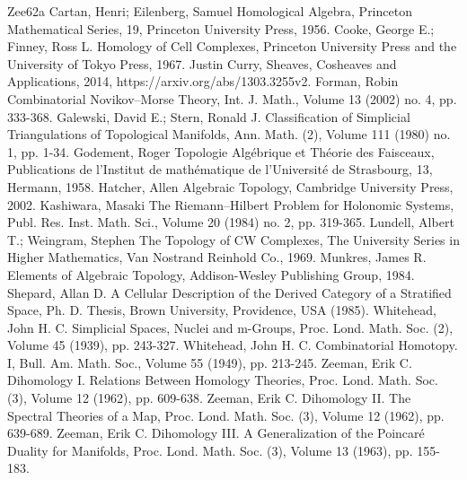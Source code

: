 
\begin{thebibliography}{Zee62a}
 Cartan, Henri; Eilenberg, Samuel Homological Algebra, Princeton Mathematical Series, 19, Princeton University Press, 1956.
 Cooke, George E.; Finney, Ross L. Homology of Cell Complexes, Princeton University Press and the University of Tokyo Press, 1967.
 Justin Curry, Sheaves, Cosheaves and Applications, 2014, https://arxiv.org/abs/1303.3255v2.
 Forman, Robin Combinatorial Novikov–Morse Theory, Int. J. Math., Volume 13 (2002) no. 4, pp. 333-368.
 Galewski, David E.; Stern, Ronald J. Classification of Simplicial Triangulations of Topological Manifolds, Ann. Math. (2), Volume 111 (1980) no. 1, pp. 1-34.
 Godement, Roger Topologie Algébrique et Théorie des Faisceaux, Publications de l’Institut de mathématique de l’Université de Strasbourg, 13, Hermann, 1958.
 Hatcher, Allen Algebraic Topology, Cambridge University Press, 2002.
 Kashiwara, Masaki The Riemann–Hilbert Problem for Holonomic Systems, Publ. Res. Inst. Math. Sci., Volume 20 (1984) no. 2, pp. 319-365.
 Lundell, Albert T.; Weingram, Stephen The Topology of CW Complexes, The University Series in Higher Mathematics, Van Nostrand Reinhold Co., 1969.
 Munkres, James R. Elements of Algebraic Topology, Addison-Wesley Publishing Group, 1984.
 Shepard, Allan D. A Cellular Description of the Derived Category of a Stratified Space, Ph. D. Thesis, Brown University, Providence, USA (1985).
 Whitehead, John H. C. Simplicial Spaces, Nuclei and m-Groups, Proc. Lond. Math. Soc. (2), Volume 45 (1939), pp. 243-327.
 Whitehead, John H. C. Combinatorial Homotopy. I, Bull. Am. Math. Soc., Volume 55 (1949), pp. 213-245.
 Zeeman, Erik C. Dihomology I. Relations Between Homology Theories, Proc. Lond. Math. Soc. (3), Volume 12 (1962), pp. 609-638.
 Zeeman, Erik C. Dihomology II. The Spectral Theories of a Map, Proc. Lond. Math. Soc. (3), Volume 12 (1962), pp. 639-689.
 Zeeman, Erik C. Dihomology III. A Generalization of the Poincaré Duality for Manifolds, Proc. Lond. Math. Soc. (3), Volume 13 (1963), pp. 155-183.
\end{thebibliography}
